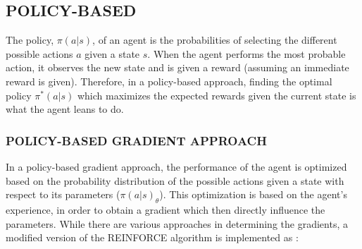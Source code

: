 \documentclass{article}
\let\oldcite\cite
\renewcommand{\cite}[1]{\textbf{\oldcite{#1}}}
\renewenvironment{leftbar}[1][\hsize]{
    \def\FrameCommand{{\color{barcolor}\vrule width 0.5pt \hspace{10pt}}}
    \MakeFramed{\hsize#1 \advance\hsize-\width \FrameRestore}
}{\endMakeFramed}
\begin{document}
\subsection*{\normalsize POLICY-BASED}
\begin{leftbar}
    The policy, $\pi(a|s)$, of an agent is the probabilities of selecting the different possible actions $a$ given a state $s$. When the agent performs the most probable action, it observes the new state and is given a reward (assuming an immediate reward is given). Therefore, in a policy-based approach, finding the optimal policy $\pi^*(a|s)$ which maximizes the expected rewards given the current state is what the agent leans to do. \cite{HF-approaches}

    \hypertarget{sec:policy-based-approach}{}
    \subsubsection*{\hfill POLICY-BASED GRADIENT APPROACH}

    In a policy-based gradient approach, the performance of the agent is optimized based on the probability distribution of the possible actions given a state with respect to its parameters ($\pi(a|s)_\theta$). This optimization is based on the agent's experience, in order to obtain a gradient which then directly influence the parameters. \cite{HF-policy} While there are various approaches in determining the gradients, a modified version of the REINFORCE algorithm is implemented as \cite{REINFORCE}:


\end{leftbar}
\end{document}
